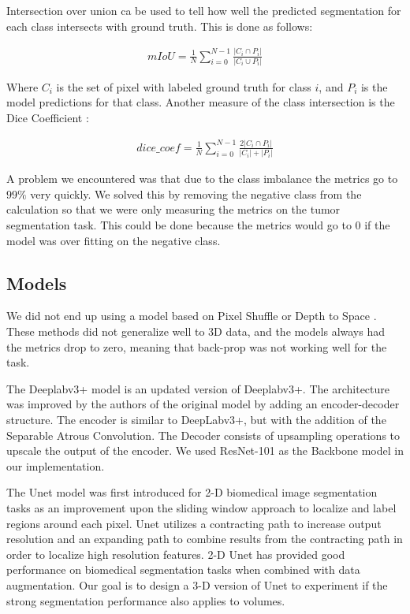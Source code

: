 \documentclass[10pt,twocolumn,letterpaper]{article}
\begin{document}
Intersection over union \cite{MET}  ca be used to tell how well  the predicted segmentation for each class intersects with ground truth. This is done as follows:

\begin{align}
mIoU = \frac{1}{N} \sum_{i=0}^{N-1} \frac{| C_i \cap P_i|}{|C_i \cup P_i|} 
\end{align}

Where $C_i$ is the set of pixel with labeled ground truth for class $i$, and $P_i$ is the model predictions for that class. Another measure of the class intersection is the Dice Coefficient \cite{MET} :

\begin{align}
dice\_coef = \frac{1}{N} \sum_{i=0}^{N-1} \frac{2| C_i \cap P_i|}{|C_i |+ | P_i|}
\end{align}

A problem we encountered was that due to the class imbalance the metrics go to $99 \%$ very quickly. We solved this by removing the negative class from the calculation so that we were only measuring  the metrics on the tumor segmentation task. This could be done because the metrics would go to 0 if the model was over fitting on the negative class.


\subsection{Models}

We did not end up using a model based on Pixel Shuffle \cite{PIX} or Depth to Space \cite{DEP}. These methods did not generalize well to 3D data, and the models always had the metrics drop to zero, meaning that back-prop was not working well for the task.

The Deeplabv3+ model is an updated version of Deeplabv3+. The architecture was improved by the authors of the original model by adding an encoder-decoder structure. The encoder is similar to DeepLabv3+, but with the addition of the Separable Atrous Convolution. The Decoder consists of upsampling operations to upscale the output of the encoder. We used ResNet-101 as the Backbone model in our implementation.
 
The Unet model was first introduced for 2-D biomedical image segmentation tasks as an improvement upon the sliding window approach to localize and label regions around each pixel. Unet utilizes a contracting path to increase output resolution and an expanding path to combine results from the contracting path in order to localize high resolution features. 2-D Unet has provided good performance on biomedical segmentation tasks when combined with data augmentation. Our goal is to design a 3-D version of Unet to experiment if the strong segmentation performance also applies to volumes.
\end{document}
